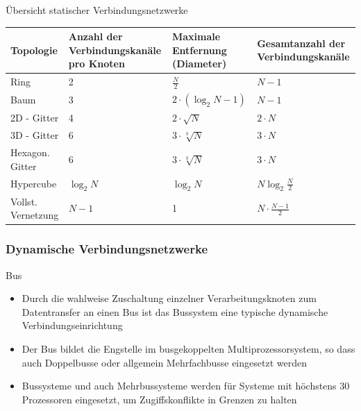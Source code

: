 \begin{bonus}{Übersicht statischer Verbindungsnetzwerke}
    \begin{tabularx}{\textwidth}{|l|X|X|X|}
        \toprule
        Topologie          & Anzahl der Verbindungskanäle pro Knoten & Maximale Entfernung (Diameter) & Gesamtanzahl der Verbindungskanäle \\
        \midrule
        Ring               & 2                                       & $\frac{N}{2}$                  & $N-1$                              \\
        \hline
        Baum               & 3                                       & $2\cdot (\log_2 N - 1)$        & $N-1$                              \\
        \hline
        2D - Gitter        & 4                                       & $2\cdot \sqrt{N}$              & $2\cdot N$                         \\
        \hline
        3D - Gitter        & 6                                       & $3\cdot \sqrt[3]{N}$           & $3\cdot N$                         \\
        \hline
        Hexagon. Gitter    & 6                                       & $3\cdot \sqrt[3]{N}$           & $3\cdot N$                         \\ 
        \hline
        Hypercube          & $\log_2 N$                              & $\log_2 N$                     & $N \log_2 \frac{N}{2}$             \\
        \hline
        Vollst. Vernetzung & $N - 1$                                 & 1                              & $N \cdot \frac{N-1}{2}$            \\
        \bottomrule
    \end{tabularx}
\end{bonus}

\subsubsection{Dynamische Verbindungsnetzwerke}

\begin{defi}{Bus}
    \begin{itemize}
        \item Durch die wahlweise Zuschaltung einzelner Verarbeitungsknoten zum Datentransfer an einen Bus ist das Bussystem eine typische dynamische Verbindungseinrichtung
        \item Der Bus bildet die Engstelle im busgekoppelten Multiprozessorsystem,
              so dass auch Doppelbusse oder allgemein Mehrfachbusse eingesetzt werden
        \item Bussysteme und auch Mehrbussysteme werden für Systeme mit höchstens 30 Prozessoren eingesetzt,
              um Zugiffskonflikte in Grenzen zu halten
    \end{itemize}
\end{defi}

